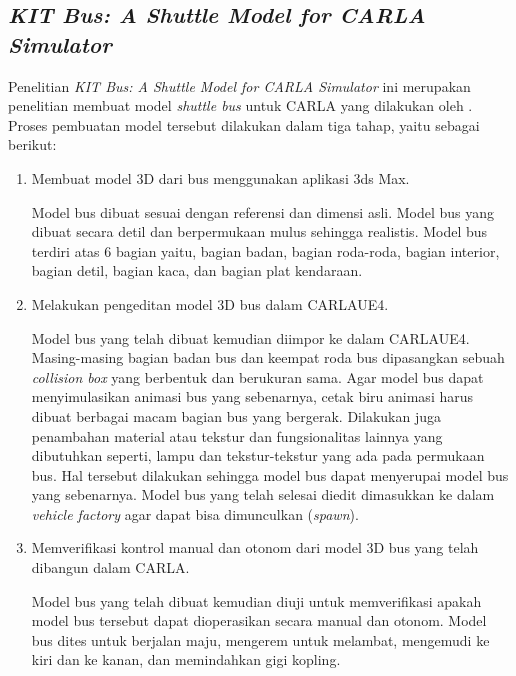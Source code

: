 \subsection{\textit{KIT Bus: A Shuttle Model for CARLA Simulator}}
Penelitian \textit{KIT Bus: A Shuttle Model for CARLA Simulator} ini merupakan
penelitian membuat model \textit{shuttle bus} untuk CARLA yang dilakukan oleh
\cite{related-work-xiang}. Proses pembuatan model tersebut dilakukan dalam tiga
tahap, yaitu sebagai berikut:
\begin{enumerate}
    \item Membuat model 3D dari bus menggunakan aplikasi 3ds Max.

    Model bus dibuat sesuai dengan referensi dan dimensi asli. Model bus yang
    dibuat secara detil dan berpermukaan mulus sehingga realistis. Model bus
    terdiri atas 6 bagian yaitu, bagian badan, bagian roda-roda, bagian
    interior, bagian detil, bagian kaca, dan bagian plat kendaraan.

    \item Melakukan pengeditan model 3D bus dalam CARLAUE4.

    Model bus yang telah dibuat kemudian diimpor ke dalam CARLAUE4.
    Masing-masing bagian badan bus dan keempat roda bus dipasangkan sebuah
    \textit{collision box} yang berbentuk dan berukuran sama. Agar model bus
    dapat menyimulasikan animasi bus yang sebenarnya, cetak biru animasi harus
    dibuat berbagai macam bagian bus yang bergerak. Dilakukan juga penambahan
    material atau tekstur dan fungsionalitas lainnya yang dibutuhkan seperti,
    lampu dan tekstur-tekstur yang ada pada permukaan bus. Hal tersebut
    dilakukan sehingga model bus dapat menyerupai model bus yang sebenarnya.
    Model bus yang telah selesai diedit dimasukkan ke dalam \textit{vehicle
    factory} agar dapat bisa dimunculkan (\textit{spawn}).

    \item Memverifikasi kontrol manual dan otonom dari model 3D bus yang telah
    dibangun dalam CARLA.

    Model bus yang telah dibuat kemudian diuji untuk memverifikasi apakah model
    bus tersebut dapat dioperasikan secara manual dan otonom. Model bus dites
    untuk berjalan maju, mengerem untuk melambat, mengemudi ke kiri dan ke
    kanan, dan memindahkan gigi kopling.

\end{enumerate}

